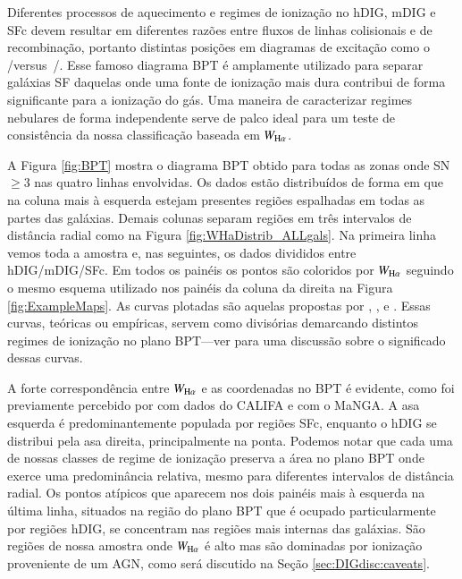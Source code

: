 Diferentes processos de aquecimento e regimes de ionização no hDIG, mDIG e SFc devem resultar em diferentes razões entre fluxos de linhas colisionais e de recombinação, portanto distintas posições em diagramas de excitação como o  \Oiii/\Hb versus\ \Nii/\Ha. Esse famoso diagrama BPT \citep*[de][]{Baldwin.Phillips.Terlevich.1981a} é amplamente utilizado para separar galáxias SF daquelas onde uma fonte de ionização mais dura contribui de forma significante para a ionização do gás. Uma maneira de caracterizar regimes nebulares de forma independente serve de palco ideal para um teste de consistência da nossa classificação baseada em $W_{\Ha}$.

A Figura \ref{fig:BPT} mostra o diagrama BPT obtido para todas as zonas onde SN $\ge 3$ nas quatro linhas envolvidas. Os dados estão distribuídos de forma em que na coluna mais à esquerda estejam presentes regiões espalhadas em todas as partes das galáxias. Demais colunas separam regiões em três intervalos de distância radial como na Figura \ref{fig:WHaDistrib_ALLgals}. Na primeira linha vemos toda a amostra e, nas seguintes, os dados divididos entre hDIG/mDIG/SFc. Em todos os painéis os pontos são coloridos por $W_{\Ha}$ seguindo o mesmo esquema utilizado nos painéis da coluna da direita na Figura \ref{fig:ExampleMaps}. As curvas plotadas são aquelas propostas por \citet[S06]{Stasinska.etal.2006a}, \citet[K03]{Kauffmann.etal.2003a}, e \citet[K01]{Kewley.etal.2001a}. Essas curvas, teóricas ou empíricas, servem como divisórias demarcando distintos regimes de ionização no plano BPT---ver \citet{CidFernandes.etal.2011a} para uma discussão sobre o significado dessas curvas.

A forte correspondência entre $W_{\Ha}$ e as coordenadas no BPT é evidente, como foi previamente percebido por \citet{Morisset.etal.2016} com dados do CALIFA e \citet{Belfiore.etal.2016} com o MaNGA. A asa esquerda é predominantemente populada por regiões SFc, enquanto o hDIG se distribui pela asa direita, principalmente na ponta. Podemos notar que cada uma de nossas classes de regime de ionização preserva a área no plano BPT onde exerce uma predominância relativa, mesmo para diferentes intervalos de distância radial. Os pontos atípicos que aparecem nos dois painéis mais à esquerda na última linha, situados na região do plano BPT que é ocupado particularmente por regiões hDIG, se concentram nas regiões mais internas das galáxias. São regiões de nossa amostra onde $W_{\Ha}$ é alto mas são dominadas por ionização proveniente de um AGN, como será discutido na Seção \ref{sec:DIGdisc:caveats}.

